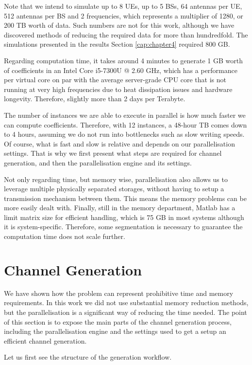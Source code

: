 Note that we intend to simulate up to 8 UEs, up to 5 BSs, 64 antennas per UE, 512 antennas per BS and 2 frequencies, which represents a multiplier of 1280, or 200 TB worth of data. Such numbers are not for this work, although we have discovered methods of reducing the required data for more than hundredfold. The simulations presented in the results Section \ref{cap:chapter4} required 800 GB. 

Regarding computation time, it takes around 4 minutes to generate 1 GB worth of coefficients in an Intel Core i5-7300U @ 2.60 GHz, which has a performance per virtual core on par with the average server-grade CPU core that is not running at very high frequencies due to heat dissipation issues and hardware longevity. Therefore, slightly more than 2 days per Terabyte. 

The number of instances we are able to execute in parallel is how much faster we can compute coefficients. Therefore, with 12 instances, a 48-hour TB comes down to 4 hours, assuming we do not run into bottlenecks such as slow writing speeds. Of course, what is fast and slow is relative and depends on our parallelisation settings. That is why we first present what steps are required for channel generation, and then the parallelisation engine and its settings.

Not only regarding time, but memory wise, parallelisation also allows us to leverage multiple physically separated storages, without having to setup a transmission mechanism between them. This means the memory problems can be more easily dealt with. Finally, still in the memory department, Matlab has a limit matrix size for efficient handling, which is 75 GB in most systems although it is system-specific. Therefore, some segmentation is necessary to guarantee the computation time does not scale further.

\section{Channel Generation}

We have shown how the problem can represent prohibitive time and memory requirements. In this work we did not use substantial memory reduction methods, but the parallelisation is a significant way of reducing the time needed. The point of this section is to expose the main parts of the channel generation process, including the parallelisation engine and the settings used to get a setup an efficient channel generation. 

Let us first see the structure of the generation workflow. 

